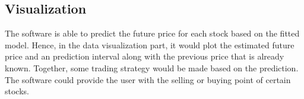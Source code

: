 \subsection{Visualization}
The software is able to predict the future price for each stock based on the fitted model. Hence, in the data visualization part, it would plot the estimated future price and an prediction interval along with the previous price that is already known. Together, some trading strategy would be made based on the prediction. The software could provide the user with the selling or buying point of certain stocks.